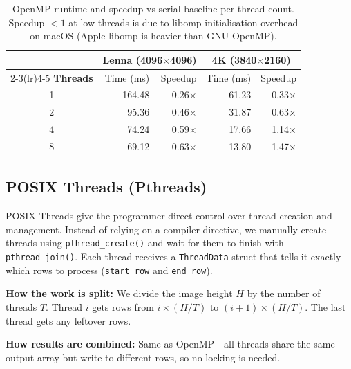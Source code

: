 \documentclass[12pt,a4paper]{article}
\begin{document}
\begin{table}[H]
\centering\small
\begin{tabular}{@{}c rr rr@{}}
\toprule
 & \multicolumn{2}{c}{\textbf{Lenna (4096$\times$4096)}} &
   \multicolumn{2}{c}{\textbf{4K (3840$\times$2160)}} \\
\cmidrule(lr){2-3}\cmidrule(lr){4-5}
\textbf{Threads} & Time (ms) & Speedup & Time (ms) & Speedup \\
\midrule
1 & 164.48 & 0.26$\times$ & 61.23 & 0.33$\times$ \\
2 & 95.36  & 0.46$\times$ & 31.87 & 0.63$\times$ \\
4 & 74.24  & 0.59$\times$ & 17.66 & 1.14$\times$ \\
8 & 69.12  & 0.63$\times$ & 13.80 & 1.47$\times$ \\
\bottomrule
\end{tabular}
\caption{OpenMP runtime and speedup vs serial baseline per thread count.
  Speedup $<1$ at low threads is due to libomp initialisation overhead on
  macOS (Apple libomp is heavier than GNU OpenMP).}
\label{tab:t_openmp}
\end{table}

\subsection{POSIX Threads (Pthreads)}
\label{subsec:pthreads}

POSIX Threads give the programmer direct control over thread creation and
management. Instead of relying on a compiler directive, we manually create
threads using \texttt{pthread\_create()} and wait for them to finish with
\texttt{pthread\_join()}. Each thread receives a \texttt{ThreadData} struct
that tells it exactly which rows to process (\texttt{start\_row} and
\texttt{end\_row}).

\textbf{How the work is split:} We divide the image height $H$ by the number
of threads $T$. Thread $i$ gets rows from $i \times (H/T)$ to
$(i+1) \times (H/T)$. The last thread gets any leftover rows.

\textbf{How results are combined:} Same as OpenMP---all threads share the
same output array but write to different rows, so no locking is needed.
\end{document}
